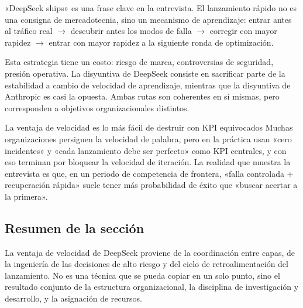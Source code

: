 «DeepSeek ships» es una frase clave en la entrevista. El lanzamiento rápido no es una consigna de mercadotecnia, sino un mecanismo de aprendizaje: entrar antes al tráfico real $\to$ descubrir antes los modos de falla $\to$ corregir con mayor rapidez $\to$ entrar con mayor rapidez a la siguiente ronda de optimización.

Esta estrategia tiene un costo: riesgo de marca, controversias de seguridad, presión operativa. La disyuntiva de DeepSeek consiste en sacrificar parte de la estabilidad a cambio de velocidad de aprendizaje, mientras que la disyuntiva de Anthropic es casi la opuesta. Ambas rutas son coherentes en sí mismas, pero corresponden a objetivos organizacionales distintos.

\begin{warningbox}{La ventaja de velocidad es lo más fácil de destruir con KPI equivocados}
Muchas organizaciones persiguen la velocidad de palabra, pero en la práctica usan «cero incidentes» y «cada lanzamiento debe ser perfecto» como KPI centrales, y con eso terminan por bloquear la velocidad de iteración. La realidad que muestra la entrevista es que, en un periodo de competencia de frontera, «falla controlada + recuperación rápida» suele tener más probabilidad de éxito que «buscar acertar a la primera».
\end{warningbox}

\subsection{Resumen de la sección}

La ventaja de velocidad de DeepSeek proviene de la coordinación entre capas, de la ingeniería de las decisiones de alto riesgo y del ciclo de retroalimentación del lanzamiento. No es una técnica que se pueda copiar en un solo punto, sino el resultado conjunto de la estructura organizacional, la disciplina de investigación y desarrollo, y la asignación de recursos.

